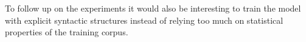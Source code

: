 \documentclass[11pt,a4paper]{article}
\begin{document}
To follow up on the experiments it would also be interesting to train the model with explicit syntactic structures instead of relying too much on statistical properties of the training corpus.





%
%


\end{document}
